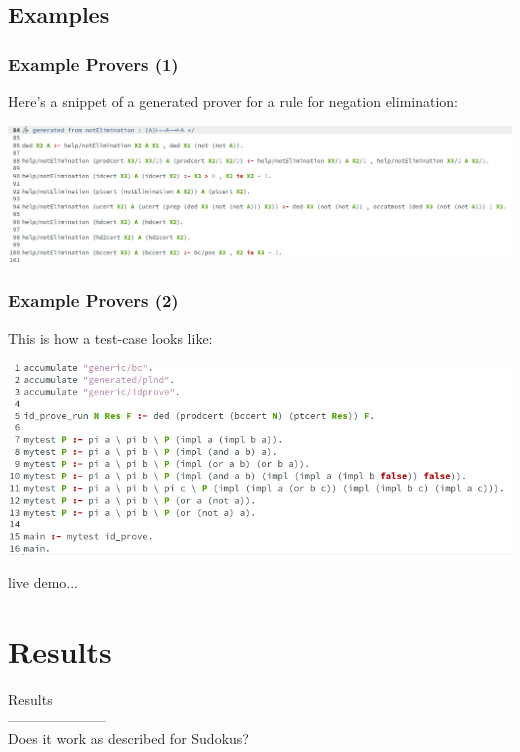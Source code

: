 \documentclass[aspectratio=169, usenames, dvipsnames]{beamer}
\begin{document}
\subsection{Examples}

\begin{frame}
\frametitle{Example Provers (1)}
Here's a snippet of a generated prover for a rule for negation elimination:
\begin{center}
\includegraphics[width=\textwidth, keepaspectratio]{images/plnd_generated.png} 
\end{center}
\end{frame}

\begin{frame}
\frametitle{Example Provers (2)}
This is how a test-case looks like:
\begin{center}
\includegraphics[width=\textwidth, keepaspectratio]{images/plnd_test.png} 
\end{center}
\end{frame}


\begin{frame}
\begin{center}
\Large
live demo...
\end{center}
\end{frame}

\section{Results}

\begin{frame}
\Huge
\begin{center}
Results\large\\
---------------------\\
Does it work as described for Sudokus?
\end{center}
\end{frame}
\end{document}
